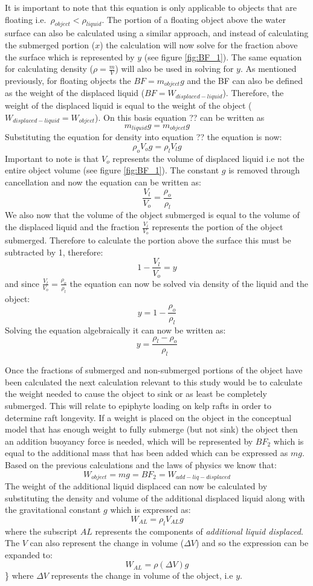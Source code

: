 \documentclass[
]{article}
\begin{document}
It is important to note that this equation is only applicable to objects
that are floating i.e.~\(\rho_{object} < \rho_{liquid}\). The portion of
a floating object above the water surface can also be calculated using a
similar approach, and instead of calculating the submerged portion
(\(x\)) the calculation will now solve for the fraction above the
surface which is represented by \(y\) (see figure \ref{fig:BF_1}). The
same equation for calculating density
(\(\rho = \displaystyle\frac{m}{V}\)) will also be used in solving for
\(y\). As mentioned previously, for floating objects the
\(BF = m_{object}g\) and the BF can also be defined as the weight of the
displaced liquid (\(BF = W_{displaced-liquid}\)). Therefore, the weight
of the displaced liquid is equal to the weight of the object
(\(W_{displaced-liquid} = W_{object}\)). On this basis equation ?? can
be written as \[m_{liquid}g = m_{object}g\] Substituting the equation
for density into equation ?? the equation is now:
\[\rho_{o}V_{o}g = \rho_{l}V_{l}g\] Important to note is that \(V_{o}\)
represents the volume of displaced liquid i.e not the entire object
volume (see figure \ref{fig:BF_1}). The constant \(g\) is removed
through cancellation and now the equation can be written as:
\[\displaystyle\frac{V_l}{V_o} = \displaystyle\frac{\rho_o}{\rho_l}\] We
also now that the volume of the object submerged is equal to the volume
of the displaced liquid and the fraction
\(\displaystyle\frac{V_l}{V_o}\) represents the portion of the object
submerged. Therefore to calculate the portion above the surface this
must be subtracted by 1, therefore:
\[1-\displaystyle\frac{V_l}{V_o} = y\] and since
\(\displaystyle\frac{V_l}{V_o} = \displaystyle\frac{\rho_o}{\rho_l}\)
the equation can now be solved via density of the liquid and the object:
\[y = 1 - \displaystyle\frac{\rho_o}{\rho_l}\] Solving the equation
algebraically it can now be written
as:\[ y = \displaystyle\frac{\rho_l - \rho_o}{\rho_l}\]

Once the fractions of submerged and non-submerged portions of the object
have been calculated the next calculation relevant to this study would
be to calculate the weight needed to cause the object to sink or as
least be completely submerged. This will relate to epiphyte loading on
kelp rafts in order to determine raft longevity. If a weight is placed
on the object in the conceptual model that has enough weight to fully
submerge (but not sink) the object then an addition buoyancy force is
needed, which will be represented by \(BF_2\) which is equal to the
additional mass that has been added which can be expressed as \(mg\).
Based on the previous calculations and the laws of physics we know that:
\[W_{object} = mg = BF_2 = W_{add-liq-displaced}\] The weight of the
additional liquid displaced can now be calculated by substituting the
density and volume of the additional displaced liquid along with the
gravitational constant \(g\) which is expressed as:
\[W_{AL} = \rho_{l}V_{AL}g\] where the subscript \(AL\) represents the
components of \emph{additional liquid displaced}. The \(V\) can also
represent the change in volume (\(\Delta V\)) and so the expression can
be expanded to: \[W_{AL} = \rho(\Delta V) g\]\} where \(\Delta V\)
represents the change in volume of the object, i.e \(y\).
\end{document}
